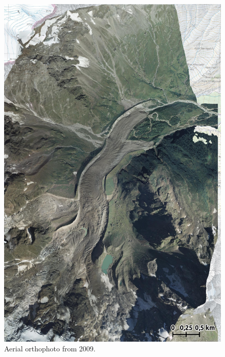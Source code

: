 \begin{figure}[p]
    \centering
    \includegraphics[height=\textheight]{figures/appendix/orto_2009.jpg}
    \caption[]{Aerial orthophoto from 2009.}
\end{figure}

